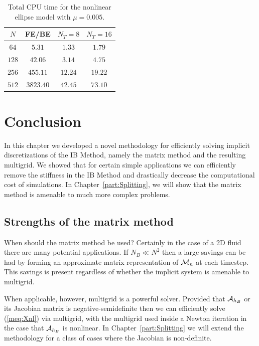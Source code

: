 \begin{table}
\caption{Total CPU time for the nonlinear ellipse model with $\mu=0.005$.}
\label{table:NonlinearEllipseSims_005CPU}
\begin{center}
\begin{tabular}{|c|c| c c|}
\hline
$N$ & FE/BE & $N_T = 8$ & $N_T = 16$\\
\hline
$64$ & $5.31$ & $1.33$ & $1.79$ \\
$128$ & $42.06$ & $3.14$ & $4.75$ \\
$256$ & $455.11$ & $12.24$ & $19.22$ \\
$512$ & $3823.40$ & $42.45$ & $73.10$ \\
\hline
\end{tabular}
\end{center}
\end{table}


\section{Conclusion}
In this chapter we developed a novel methodology for efficiently solving implicit discretizations of the IB Method, namely the matrix method and the resulting multigrid. We showed that for certain simple applications we can efficiently remove the stiffness in the IB Method and drastically decrease the computational cost of simulations. In Chapter~\ref{part:Splitting}, we will show that the matrix method is amenable to much more complex problems.

\subsection{Strengths of the matrix method}
When should the matrix method be used? Certainly in the case of a 2D fluid there are many potential applications. If $N_B \ll N^2$ then a large savings can be had by forming an approximate matrix representation of $\mathcal{M}_n$ at each timestep. This savings is present regardless of whether the implicit system is amenable to multigrid.

When applicable, however, multigrid is a powerful solver. Provided that $\mathcal{A}_{h_B}$ or its Jacobian matrix is negative-semidefinite then we can efficiently solve (\ref{meq:Xnl}) via multigrid, with the multigrid used inside a Newton iteration in the case that $\mathcal{A}_{h_B}$ is nonlinear. In Chapter~\ref{part:Splitting} we will extend the methodology for a class of cases where the Jacobian is non-definite.


